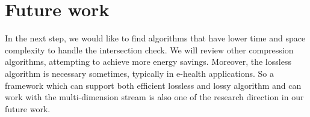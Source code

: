\section{Future work}

In the next step, we would like to find algorithms that have lower time and
space complexity to handle the intersection check. We will review other
compression algorithms, attempting to achieve more energy savings. Moreover, the
lossless algorithm is necessary sometimes, typically in e-health applications.
So a framework which can support both efficient lossless and lossy algorithm and
can work with the multi-dimension stream is also one of the research direction
in our future work.
